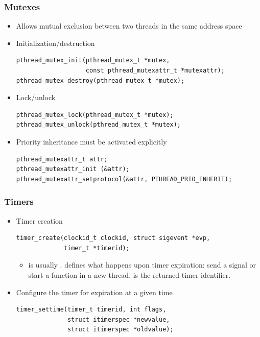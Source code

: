 \begin{frame}[fragile]
  \frametitle{Mutexes}
  \begin{itemize}
  \item Allows mutual exclusion between two threads in the same
    address space
  \item Initialization/destruction
    \begin{block}{}
\footnotesize
\begin{verbatim}
pthread_mutex_init(pthread_mutex_t *mutex,
                   const pthread_mutexattr_t *mutexattr);
pthread_mutex_destroy(pthread_mutex_t *mutex);
\end{verbatim}
\normalsize
    \end{block}
  \item Lock/unlock
    \begin{block}{}
\footnotesize
\begin{verbatim}
pthread_mutex_lock(pthread_mutex_t *mutex);
pthread_mutex_unlock(pthread_mutex_t *mutex);
\end{verbatim}
\normalsize
    \end{block}
  \item Priority inheritance must be activated explicitly
    \begin{block}{}
\footnotesize
\begin{verbatim}
pthread_mutexattr_t attr;
pthread_mutexattr_init (&attr);
pthread_mutexattr_setprotocol(&attr, PTHREAD_PRIO_INHERIT);
\end{verbatim}
\normalsize
    \end{block}
  \end{itemize}
\end{frame}

\begin{frame}[fragile]
  \frametitle{Timers}
  \small
  \begin{itemize}
  \item Timer creation
    \begin{block}{}
\footnotesize
\begin{verbatim}
timer_create(clockid_t clockid, struct sigevent *evp,
             timer_t *timerid);
\end{verbatim}
\small
    \end{block}
    \begin{itemize}
    \item {} is usually
      .  defines what happens
      upon timer expiration: send a signal or start a function in a
      new thread.  is the returned timer identifier.
    \end{itemize}
  \item Configure the timer for expiration at a given time
    \begin{block}{}
\footnotesize
\begin{verbatim}
timer_settime(timer_t timerid, int flags,
              struct itimerspec *newvalue,
              struct itimerspec *oldvalue);
\end{verbatim}
\small
    \end{block}
  \end{itemize}
\end{frame}

